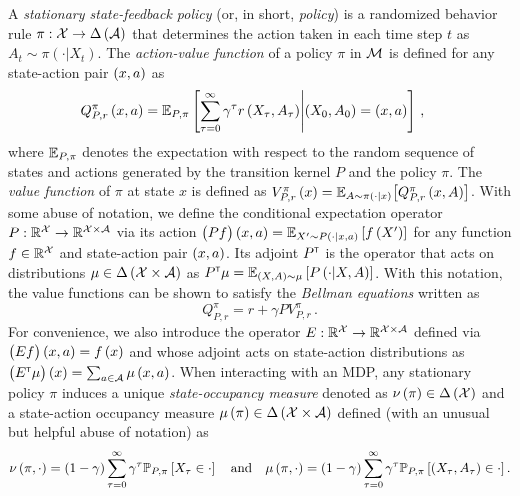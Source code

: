A \emph{stationary state-feedback policy} (or, in short, \emph{policy}) is a randomized behavior rule $\pi: \mathcal{X} \rightarrow \Delta \left( \mathcal{A} \right)$ that determines the action taken in each time step $t$ as $A_t \sim \pi(\cdot | X_t)$. The \emph{action-value function} of a policy $\pi$ in $\mathcal{M}$ is defined for any state-action pair $\left( x, a \right)$ as
%
\begin{align*}
    Q_{P, r}^\pi \left( x, a \right) &= \mathbb{E}_{P, \pi} \left[ \sum_{\tau=0}^\infty \gamma^\tau r \left( X_\tau, A_\tau \right) \middle| (X_0,A_0) = (x,a) \right]\,,
\end{align*}
%
where $\mathbb{E}_{P, \pi}$ denotes the expectation with respect to the random sequence of states and actions generated by the transition kernel $P$ and the policy $\pi$. The \emph{value function} of $\pi$ at state $x$  is defined as $V_{P, r}^\pi \left( x \right) = \mathbb{E}_{A \sim \pi \left( \cdot \middle| x \right)} \bigl[Q_{P, r}^\pi \left( x, A \right)\bigr]$. With some abuse of notation, we define the conditional expectation operator $P: \mathbb{R}^{\mathcal{X}} \rightarrow \mathbb{R}^{\mathcal{X} \times \mathcal{A}}$ via its action $\bigl(P f\bigr) \left( x, a \right) = \mathbb{E}_{X' \sim P \left( \cdot \middle| x, a \right)} \left[ f \left( X' \right) \right]$ for any function $f \in \mathbb{R}^{\mathcal{X}}$ and state-action pair $\left( x, a \right)$. Its adjoint $P^\mathsf{\scriptscriptstyle T}$ is the operator that acts on distributions $\mu \in \Delta \left( \mathcal{X} \times \mathcal{A} \right)$ as $P^\mathsf{\scriptscriptstyle T} \mu = \mathbb{E}_{\left( X, A \right) \sim \mu} \left[ P \left( \cdot \middle| X, A \right) \right]$. With this notation, the value functions can be shown to satisfy the \emph{Bellman equations} written as
%
\begin{equation*}
    Q_{P, r}^\pi = r + \gamma P V_{P, r}^\pi\,.
\end{equation*}
%
For convenience, we also introduce the operator $E: \mathbb{R}^{\mathcal{X}} \rightarrow \mathbb{R}^{\mathcal{X} \times \mathcal{A}}$ defined via $\bigl(E f\bigr) \left( x, a \right) = f \left( x \right)$ and whose adjoint acts on state-action distributions as $\bigl(E^\mathsf{\scriptscriptstyle T} \mu \bigr)\left( x \right) = \sum_{a \in \mathcal{A}} \mu \left( x, a \right)$. When interacting with an  MDP, any stationary policy $\pi$ induces a unique \emph{state-occupancy measure} denoted as $\nu\left( \pi \right) \in \Delta \left( \mathcal{X} \right)$ and a state-action occupancy measure $\mu\left( \pi \right) \in \Delta \left( \mathcal{X}\times\mathcal{A} \right)$ defined (with an unusual but helpful abuse of notation) as
%
\begin{equation*}
    \nu\left( \pi,\cdot \right) = \left( 1 - \gamma \right) \sum_{\tau=0}^\infty \gamma^\tau \mathbb{P}_{P, \pi} \left[ X_\tau \in \cdot \right] \quad \mbox{and} \quad \mu\left( \pi,\cdot \right) = \left( 1 - \gamma \right) \sum_{\tau=0}^\infty \gamma^\tau \mathbb{P}_{P, \pi} \left[ (X_\tau,A_\tau) \in \cdot \right].
\end{equation*}


